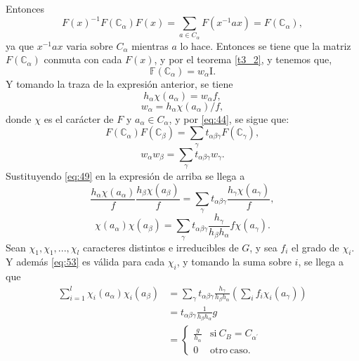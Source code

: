\documentclass[12pt]{book}
\theoremstyle{definition}
\newcounter{in}
\begin{document}
Entonces
\begin{equation}
  \label{eq:47}
  F(x)^{-1}F(\mathbb{C}_{\alpha})F(x)=\sum_{a \in C_{\alpha}}F(x^{-1}ax)=F(\mathbb{C}_{\alpha}),
\end{equation}
ya que $x^{-1}ax$ varia sobre $C_{\alpha}$ mientras $a$ lo
hace. Entonces se tiene que la matriz $F (\mathbb{C}_{\alpha})$ conmuta con cada $F(x)$, y
por el teorema \ref{t3_2}, y tenemos que,
\begin{equation}
  \label{eq:48}
   \mathbb{F} (\mathbb{C}_{\alpha})=w_{\alpha}\mathrm{I}.
\end{equation}
Y tomando la traza de la expresión anterior, se tiene
\begin{equation}
  \label{eq:49}
  h_{\alpha}\chi(a_{\alpha})=w_{\alpha}f,
\end{equation}
\begin{equation}
  \label{eq:50}
  w_{\alpha}=h_{\alpha}\chi(a_{\alpha})/f,
\end{equation}
donde $\chi$ es el carácter de $F$ y
$a_{\alpha} \in C_{\alpha}$, y por \ref{eq:44}, se sigue que:
\begin{equation}
  \label{eq:51}
  F (\mathbb{C}_{\alpha})  F (\mathbb{C}_{\beta}) = \sum_{\gamma} t_{\alpha \beta \gamma} F(\mathbb{C}_{\gamma}),
\end{equation}
\begin{equation}
  \label{eq:52}
  w_{\alpha}w_{\beta} = \sum_{\gamma} t_{\alpha \beta \gamma} w_{\gamma}.
\end{equation}
Sustituyendo \ref{eq:49} en la expresión de arriba se llega a
\begin{equation*}
  \frac{h_{\alpha} \chi(a_{\alpha})}{f} \frac{h_{\beta} \chi(a_{\beta})}{f} = \sum_{\gamma} t_{\alpha \beta \gamma} \frac{h_{\gamma} \chi(a_{\gamma})}{f},
\end{equation*}
\begin{equation}
  \label{eq:53}
   \chi(a_{\alpha}) \chi(a_{\beta}) = \sum_{\gamma} t_{\alpha \beta \gamma} \frac{h_{\gamma}}{h_{\beta} h_{\alpha}} f \chi(a_{\gamma}).
\end{equation}
Sean $\chi_{1}, \chi_{1},..., \chi_{l}$ caracteres distintos e
irreducibles de $G$, y sea $f_{i}$ el grado de $\chi_{i}$. Y además
\ref{eq:53} es válida para cada $\chi_{i}$, y tomando la suma sobre
$i$, se llega a que
\begin{equation}
  \label{eq:54}
  \begin{aligned}
    \sum_{i=1}^{l} \chi_{i}(a_{\alpha}) \chi_{i}(a_{\beta}) &= \sum_{\gamma} t_{\alpha \beta \gamma} \frac{h_{\gamma}}{h_{\beta} h_{\alpha}} (\sum_{i} f_{i} \chi_{i}(a_{\gamma})) \\
    &= t_{\alpha \beta \gamma} \frac{1}{h_{\beta} h_{\alpha}}g \\
    &=  \left\{
	       \begin{array}{ll}
		 \frac{g}{h_{\alpha}}      & \mathrm{si\ } C_{B} = C_{\alpha^{'}} \\
		 0      & \mathrm{otro\ caso.\ } 
	       \end{array}
	     \right.
    \end{aligned}
\end{equation}
\end{document}
